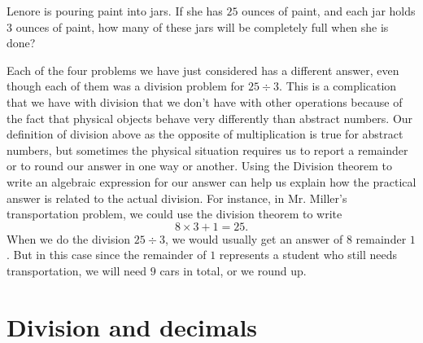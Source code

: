 \documentclass{ximera}
\begin{document}
\begin{question}
Lenore is pouring paint into jars. If she has $25$ ounces of paint, and each jar holds $3$ ounces of paint, how many of these jars will be completely full when she is done?
\begin{multipleChoice}
\end{multipleChoice}
\end{question}

Each of the four problems we have just considered has a different answer, even though each of them was a division problem for $25 \div 3$. This is a complication that we have with division that we don't have with other operations because of the fact that physical objects behave very differently than abstract numbers. Our definition of division above as the opposite of multiplication is true for abstract numbers, but sometimes the physical situation requires us to report a remainder or to round our answer in one way or another. Using the Division theorem to write an algebraic expression for our answer can help us explain how the practical answer is related to the actual division. For instance, in Mr. Miller's transportation problem, we could use the division theorem to write
\[
8 \times 3 + 1 = 25.
\]
When we do the division $25 \div 3$, we would usually get an answer of $8$ remainder $1$. But in this case since the remainder of $1$ represents a student who still needs transportation, we will need $9$ cars in total, or we round up.



\section{Division and decimals}
\end{document}
